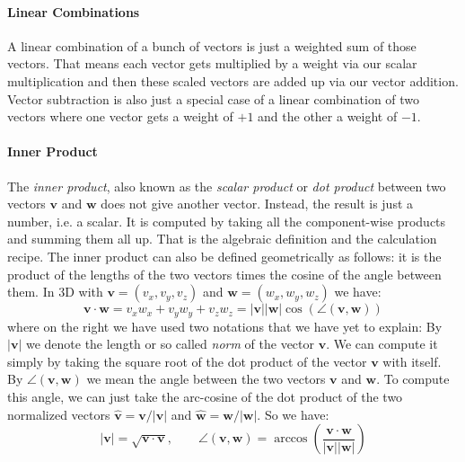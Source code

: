 

\paragraph{Linear Combinations}
A linear combination of a bunch of vectors is just a weighted sum of those vectors. That means each vector gets multiplied by a weight via our scalar multiplication and then these scaled vectors are added up via our vector addition. Vector subtraction is also just a special case of a linear combination of two vectors where one vector gets a weight of $+1$ and the other a weight of $-1$. 



\paragraph{Inner Product}
The \emph{inner product}, also known as the \emph{scalar product} or \emph{dot product} between two vectors $\mathbf{v}$ and $\mathbf{w}$ does not give another vector. Instead, the result is just a number, i.e. a scalar. It is computed by taking all the component-wise products and summing them all up. That is the algebraic definition and the calculation recipe. The inner product can also be defined geometrically as follows: it is the product of the lengths of the two vectors times the cosine of the angle between them. In 3D with $\mathbf{v} = (v_x, v_y, v_z)$ and $\mathbf{w} = (w_x, w_y, w_z)$ we have:
\begin{equation}
 \mathbf{v} \cdot \mathbf{w} 
 = v_x w_x + v_y w_y + v_z w_z 
 = |\mathbf{v}| |\mathbf{w}| \cos( \angle(\mathbf{v}, \mathbf{w}) )
\end{equation}
where on the right we have used two notations that we have yet to explain: By $|\mathbf{v}|$ we denote the length or so called \emph{norm} of the vector $\mathbf{v}$. We can compute it simply by taking the square root of the dot product of the vector $\mathbf{v}$ with itself. By $\angle(\mathbf{v}, \mathbf{w})$ we mean the angle between the two vectors $\mathbf{v}$ and $\mathbf{w}$. To compute this angle, we can just take the arc-cosine of the dot product of the two normalized vectors $\mathbf{\hat{v}} = \mathbf{v} / |\mathbf{v}|$ and  $\mathbf{\hat{w}} = \mathbf{w} / |\mathbf{w}|$. So we have:
\begin{equation}
|\mathbf{v}| = \sqrt{ \mathbf{v} \cdot \mathbf{v}}, 
\qquad 
\angle(\mathbf{v}, \mathbf{w}) = 
 \arccos \left( \frac{\mathbf{v} \cdot \mathbf{w}} {|\mathbf{v}|  |\mathbf{w}|} \right)
\end{equation}
